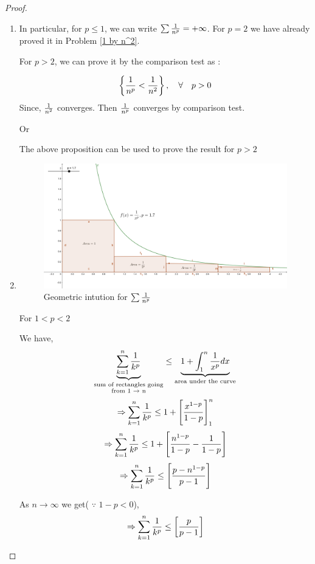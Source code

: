 \documentclass{notes}
\begin{document}
\begin{proof}
	\begin{enumerate}
		\item
		In particular, for $p\leq 1$, we can write $\sum{1 \over n^p}  = + \infty$.
		For $ p = 2$ we have already proved it in Problem \ref{1 by n^2}.
		
		For $p>2$, we can prove it by the comparison test as :
		
		$$ \left\{{1 \over n^p } < {1 \over n^2}\right\}, \quad \forall \quad p>0$$ 
		Since, ${1 \over n^2}$ converges. Then ${1 \over n^p}$ converges by comparison test.
		\begin{center}
			Or
		\end{center}
		The above proposition can be used to prove the result for $p>2$
		
		\item
		\begin{figure}[h!]  %
			\begin{center}
				\includegraphics[width=\textwidth]{geogebra.png}
				\caption{Geometric intution for $\sum{1 \over n^p }$}
			\end{center}
		\end{figure}
		For $ 1 < p<2$
		
		We have,
		$$ \underbrace{\sum_{k=1}^{n} {1 \over k^p}}_{\substack{ \text{sum of rectangles going} \\ \text{from 1 $\to$ n}}} \leq \underbrace{1 + \int_{1}^{n} {1 \over x^p}dx}_\text{area under the curve} $$
		$$   \Rightarrow \sum_{k=1}^{n} {1 \over k^p} \leq 1 + \left[ x^{1-p} \over {1-p} \right]_{1}^{n}      $$
		$$ \Rightarrow   \sum_{k=1}^{n} {1 \over k^p} \leq 1 + \left[ {n^{1-p} \over {1-p} } - {1 \over {1-p}}\right]     $$
		$$ \Rightarrow   \sum_{k=1}^{n} {1 \over k^p} \leq \left[ {p - n^{1-p} \over p-1} \right]     $$
		
		As $ n\to \infty$ we get( $\because$ $1-p<0$),
		$$ \Rightarrow   \sum_{k=1}^{n} {1 \over k^p} \leq \left[ {p \over p-1} \right]     $$
	
	\end{enumerate}
	
\end{proof}
\end{document}

